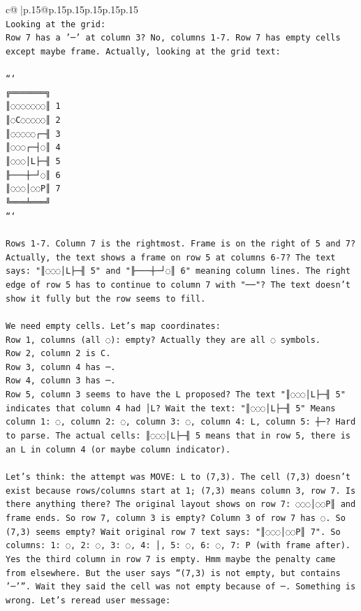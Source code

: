 \documentclass{article}
\begin{document}
{\begin{supertabular}{c@{$\;$}|p{.15\linewidth}@{}p{.15\linewidth}p{.15\linewidth}p{.15\linewidth}p{.15\linewidth}p{.15\linewidth}}
{{{\\ 
\texttt{Looking at the grid:  } \\
\texttt{Row 7 has a '─' at column 3? No, columns 1{-}7. Row 7 has empty cells except maybe frame. Actually, looking at the grid text:  } \\
\\ 
\texttt{```} \\
\texttt{╔═══════╗} \\
\texttt{║◌◌◌◌◌◌◌║ 1} \\
\texttt{║◌C◌◌◌◌◌║ 2} \\
\texttt{║◌◌◌◌◌┌─╢ 3} \\
\texttt{║◌◌◌┌─┤◌║ 4} \\
\texttt{║◌◌◌│L├─╢ 5} \\
\texttt{╟───┼─┘◌║ 6} \\
\texttt{║◌◌◌│◌◌P║ 7} \\
\texttt{╚═══╧═══╝} \\
\texttt{```} \\
\\ 
\texttt{Rows 1{-}7. Column 7 is the rightmost. Frame is on the right of 5 and 7?  } \\
\texttt{Actually, the text shows a frame on row 5 at columns 6{-}7? The text says: "║◌◌◌│L├─╢ 5" and "╟───┼─┘◌║ 6" meaning column lines. The right edge of row 5 has to continue to column 7 with "──"? The text doesn't show it fully but the row seems to fill.  } \\
\\ 
\texttt{We need empty cells. Let's map coordinates:  } \\
\texttt{Row 1, columns (all ◌): empty? Actually they are all ◌ symbols.  } \\
\texttt{Row 2, column 2 is C.  } \\
\texttt{Row 3, column 4 has ─.  } \\
\texttt{Row 4, column 3 has ─.  } \\
\texttt{Row 5, column 3 seems to have the L proposed? The text "║◌◌◌│L├─╢ 5" indicates that column 4 had │L? Wait the text: "║◌◌◌│L├─╢ 5" Means column 1: ◌, column 2: ◌, column 3: ◌, column 4: L, column 5: ┼─? Hard to parse. The actual cells: ║◌◌◌│L├─╢ 5 means that in row 5, there is an L in column 4 (or maybe column indicator).  } \\
\\ 
\texttt{Let's think: the attempt was MOVE: L to (7,3). The cell (7,3) doesn't exist because rows/columns start at 1; (7,3) means column 3, row 7. Is there anything there? The original layout shows on row 7: ◌◌◌│◌◌P║ and frame ends. So row 7, column 3 is empty? Column 3 of row 7 has ◌. So (7,3) seems empty? Wait original row 7 text says: "║◌◌◌│◌◌P║ 7". So columns: 1: ◌, 2: ◌, 3: ◌, 4: │, 5: ◌, 6: ◌, 7: P (with frame after). Yes the third column in row 7 is empty. Hmm maybe the penalty came from elsewhere. But the user says “(7,3) is not empty, but contains '─'”. Wait they said the cell was not empty because of ─. Something is wrong. Let's reread user message:  } \\
}}}
\end{supertabular}}
\end{document}
